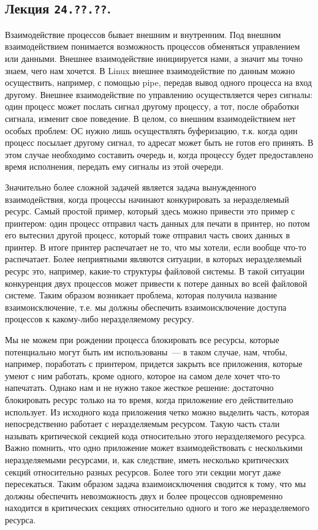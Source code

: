 \subsection{%
  Лекция \texttt{24.??.??}.%
}


Взаимодействие процессов бывает внешним и внутренним. Под внешним
взаимодействием понимается возможность процессов обменяться управлением или
данными. Внешнее взаимодействие инициируется нами, а значит мы точно знаем, чего
нам хочется. В Linux внешнее взаимодействие по данным можно осуществить,
например, с помощью pipe, передав вывод одного процесса на вход другому. Внешнее
взаимодействие по управлению осуществляется через сигналы: один процесс может
послать сигнал другому процессу, а тот, после обработки сигнала, изменит свое
поведение. В целом, со внешним взаимодействием нет особых проблем: ОС нужно лишь
осуществлять буферизацию, т.к. когда один процесс посылает другому сигнал, то
адресат может быть не готов его принять. В этом случае необходимо составить
очередь и, когда процессу будет предоставлено время исполнения, передать ему
сигналы из этой очереди.

Значительно более сложной задачей является задача вынужденного взаимодействия,
когда процессы начинают конкурировать за неразделяемый ресурс. Самый простой
пример, который здесь можно привести это пример с принтером: один процесс
отправил часть данных для печати в принтер, но потом его вытеснил другой
процесс, который тоже отправил часть своих данных в принтер. В итоге принтер
распечатает не то, что мы хотели, если вообще что-то распечатает. Более
неприятными являются ситуации, в которых неразделяемый ресурс это, например,
какие-то структуры файловой системы. В такой ситуации конкуренция двух процессов
может привести к потере данных во всей файловой системе. Таким образом возникает
проблема, которая получила название взаимоисключение, т.е. мы должны обеспечить
взаимоисключение доступа процессов к какому-либо неразделяемому ресурсу.

Мы не можем при рождении процесса блокировать все ресурсы, которые потенциально
могут быть им использованы~--- в таком случае, нам, чтобы, например, поработать
с принтером, придется закрыть все приложения, которые умеют с ним работать,
кроме одного, которое на самом деле хочет что-то напечатать. Однако нам и не
нужно такое жесткое решение: достаточно блокировать ресурс только на то время,
когда приложение его действительно использует. Из исходного кода приложения
четко можно выделить часть, которая непосредственно работает с неразделяемым
ресурсом. Такую часть стали называть критической секцией кода относительно этого
неразделяемого ресурса. Важно помнить, что одно приложение может
взаимодействовать с несколькими неразделяемыми ресурсами, и, как следствие,
иметь несколько критических секций относительно разных ресурсов. Более того эти
секции могут даже пересекаться. Таким образом задача взаимоисключения сводится к
тому, что мы должны обеспечить невозможность двух и более процессов одновременно
находится в критических секциях относительно одного и того же неразделяемого
ресурса.

